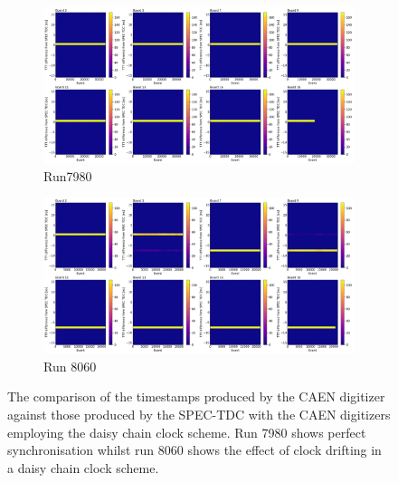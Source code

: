 \begin{figure}[htbp!]
\begin{subfigure}[h]{1.00\linewidth}
\centering    
\includegraphics[width=\linewidth]{TTT_SPEC_diff_run7980}
\caption{Run7980}
\end{subfigure}
\hfill
\begin{subfigure}[h]{1.00\linewidth}
\centering    
\includegraphics[width=\linewidth]{TTT_SPEC_diff_run8060}
\caption{Run 8060}
\end{subfigure}%
\caption{
The comparison of the timestamps produced by the CAEN digitizer against those produced by the SPEC-TDC with the CAEN digitizers employing the daisy chain clock scheme.
Run 7980 shows perfect synchronisation whilst run 8060 shows the effect of clock drifting in a daisy chain clock scheme.
}
\label{fig:daisychain_spec}
\end{figure}

